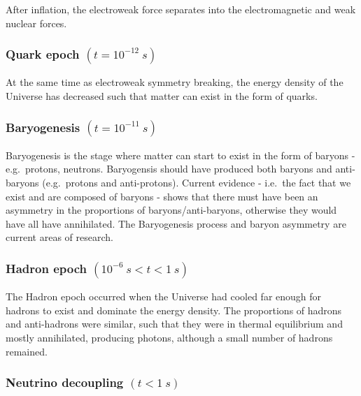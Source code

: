 \documentclass[]{book}
\begin{document}
After inflation, the electroweak force separates into the
electromagnetic and weak nuclear forces.

\subsubsection*{\texorpdfstring{Quark epoch
\((t = 10^{-12}~s)\)}{Quark epoch (t = 10\^{}\{-12\}\textasciitilde{}s)}}\label{quark-epoch-t-10-12s}

At the same time as electroweak symmetry breaking, the energy density of
the Universe has decreased such that matter can exist in the form of
quarks.

\subsubsection*{\texorpdfstring{Baryogenesis
\((t = 10^{-11}~s)\)}{Baryogenesis (t = 10\^{}\{-11\}\textasciitilde{}s)}}\label{baryogenesis-t-10-11s}

Baryogenesis is the stage where matter can start to exist in the form of
baryons - e.g.~protons, neutrons. Baryogensis should have produced both
baryons and anti-baryons (e.g.~protons and anti-protons). Current
evidence - i.e.~the fact that we exist and are composed of baryons -
shows that there must have been an asymmetry in the proportions of
baryons/anti-baryons, otherwise they would have all have annihilated.
The Baryogenesis process and baryon asymmetry are current areas of
research.

\subsubsection*{\texorpdfstring{Hadron epoch
\((10^{-6}~s < t < 1~s)\)}{Hadron epoch (10\^{}\{-6\}\textasciitilde{}s \textless{} t \textless{} 1\textasciitilde{}s)}}\label{hadron-epoch-10-6s-t-1s}

The Hadron epoch occurred when the Universe had cooled far enough for
hadrons to exist and dominate the energy density. The proportions of
hadrons and anti-hadrons were similar, such that they were in thermal
equilibrium and mostly annihilated, producing photons, although a small
number of hadrons remained.

\subsubsection*{\texorpdfstring{Neutrino decoupling
\((t < 1~s)\)}{Neutrino decoupling (t \textless{} 1\textasciitilde{}s)}}\label{neutrino-decoupling-t-1s}
\end{document}
